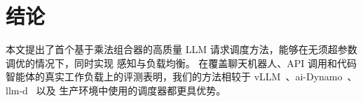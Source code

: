 \section{结论}
\label{sec:concl}

\noindent
本文提出了首个基于乘法组合器的高质量 LLM 请求调度方法，能够在无须超参数调优的情况下，同时实现 {\kvcache} 感知与负载均衡。
在覆盖聊天机器人、API 调用和代码智能体的真实工作负载上的评测表明，我们的方法相较于 vLLM~\cite{vllm-code}、ai-Dynamo~\cite{ai-Dynamo}、llm-d~\cite{llm-d} 以及 {\company} 生产环境中使用的调度器都更具优势。
